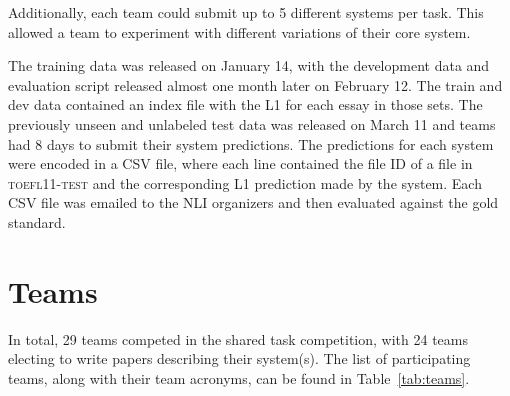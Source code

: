 \documentclass[11pt,letterpaper]{article}
\begin{document}
Additionally, each team could submit up to 5 different
systems per task.  This allowed a team to experiment with different
variations of their core system.

The training data was released on January 14, with the development
data and evaluation script released almost one month later on February 12.
The train and dev data contained an index file with the L1 for each
essay in those sets.  The previously unseen and unlabeled test data was
released on March 11 and teams had 8 days to submit their system predictions.
The predictions for each system
were encoded in a CSV file, where each line contained the file ID of a
file in \textsc{toefl11-test} and the corresponding L1 prediction made by the
system.  Each CSV file was emailed to the NLI organizers and then
evaluated against the gold standard.


\section{Teams}
\label{sec-teams}
In total, 29 teams competed in the shared task competition, with 24 teams
electing to write papers describing their system(s).  The list
of participating teams, along with their team acronyms, can be
found in Table~\ref{tab:teams}.
\end{document}
